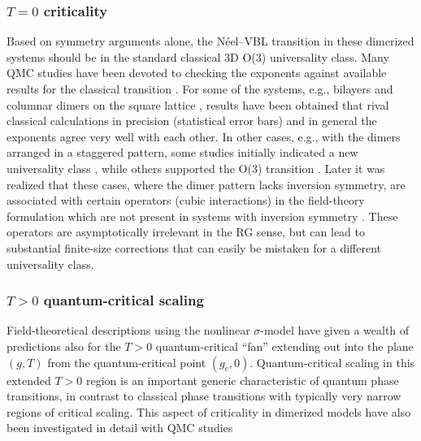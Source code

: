 \documentclass[range]{ar2e}
\begin{document}
\subsubsection{$T=0$ criticality}
Based on symmetry arguments alone, the N\'eel--VBL transition in these dimerized systems
should be in the standard classical 3D O($3$) universality class. Many QMC studies 
have been devoted to checking the exponents against available results for the classical transition \cite{Sandvik94,Troyer96,Matsumoto01,Wang06,Wenzel08,Wenzel09}.
For some of the systems, e.g., bilayers \cite{Wang06} and columnar dimers on the square lattice \cite{Matsumoto01,Wenzel09,Sandvik10b}, results have been 
obtained that rival classical calculations in precision (statistical error bars) and in general the exponents agree very well with each other. In other 
cases, e.g., with the dimers arranged in a staggered pattern, some studies initially indicated a new universality class \cite{Wenzel08}, while others
supported the O($3$) transition \cite{Jiang12}.  Later it was realized that these cases, where the dimer pattern lacks inversion symmetry, are associated 
with certain operators (cubic interactions) in the field-theory formulation  which are not present in systems with inversion symmetry \cite{Fritz11}. 
These operators are asymptotically irrelevant in the RG sense, but can lead to substantial finite-size corrections that can easily be mistaken for a 
different universality class.

\subsubsection{$T>0$ quantum-critical scaling}
Field-theoretical descriptions using the nonlinear $\sigma$-model \cite{Haldane83,Chakravarty89,Chubukov94} have given a wealth of 
predictions also for the $T>0$ quantum-critical ``fan'' extending out into the plane $(g,T)$  from the quantum-critical point $(g_c,0)$. Quantum-critical
scaling in this extended $T>0$ region is an important generic characteristic of quantum phase transitions, in contrast to classical phase transitions with typically 
very narrow regions of critical scaling. This aspect of criticality in dimerized models have also been investigated in detail with QMC 
studies \cite{Sandvik95,Brenig06,Sandvik11a}
\end{document}
